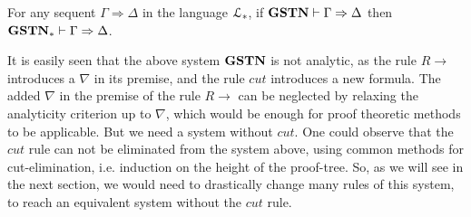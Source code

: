   \begin{thm}\label{thm:gstn-cons-ext}
    For any sequent $\Gamma \Rightarrow \Delta$ in the language $\mathcal{L}_*$, if $\mathbf{GSTN} \vdash \Gamma \Rightarrow \Delta$ then $\mathbf{GSTN}_* \vdash \Gamma \Rightarrow \Delta$.
  \end{thm}

  It is easily seen that the above system $\mathbf{GSTN}$ is not analytic, as the rule $R \rightarrow$ introduces a $\nabla$ in its premise, and the rule $cut$ introduces a new formula. The added $\nabla$ in the premise of the rule $R \rightarrow$ can be neglected by relaxing the analyticity criterion up to $\nabla$, which would be enough for proof theoretic methods to be applicable. But we need a system without $cut$.  One could observe that the $cut$ rule can not be eliminated from the system above, using common methods for cut-elimination, i.e. induction on the height of the proof-tree. So, as we will see in the next section, we would need to drastically change many rules of this system, to reach an equivalent system without the $cut$ rule.